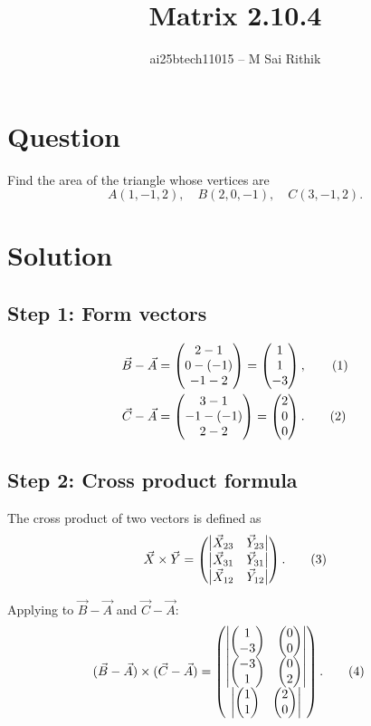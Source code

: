 \documentclass[12pt]{article}
\title{Matrix 2.10.4}
\author{ai25btech11015 -- M Sai Rithik}
\date{}
\begin{document}
\maketitle

\section*{Question}
Find the area of the triangle whose vertices are 
\[
A(1,-1,2), \quad B(2,0,-1), \quad C(3,-1,2).
\]

\section*{Solution}

\subsection*{Step 1: Form vectors}
\begin{align}
\Vec{B}-\Vec{A} &= \begin{pmatrix}2-1 \\ 0-(-1) \\ -1-2\end{pmatrix} = \begin{pmatrix}1 \\ 1 \\ -3\end{pmatrix}, \tag{1}\\
\Vec{C}-\Vec{A} &= \begin{pmatrix}3-1 \\ -1-(-1) \\ 2-2\end{pmatrix} = \begin{pmatrix}2 \\ 0 \\ 0\end{pmatrix}. \tag{2}
\end{align}

\subsection*{Step 2: Cross product formula}
The cross product of two vectors is defined as
\begin{align}
\Vec{X}\times\Vec{Y} =
\begin{pmatrix}
  \begin{vmatrix}\Vec{X}_{23} & \Vec{Y}_{23}\end{vmatrix} \\
  \begin{vmatrix}\Vec{X}_{31} & \Vec{Y}_{31}\end{vmatrix} \\
  \begin{vmatrix}\Vec{X}_{12} & \Vec{Y}_{12}\end{vmatrix}
\end{pmatrix}. \tag{3}
\end{align}

Applying to $\Vec{B}-\Vec{A}$ and $\Vec{C}-\Vec{A}$:
\begin{align}
(\Vec{B}-\Vec{A})\times(\Vec{C}-\Vec{A})
&= 
\begin{pmatrix}
\begin{vmatrix}\begin{pmatrix}1 \\ -3\end{pmatrix} & \begin{pmatrix}0 \\ 0\end{pmatrix}\end{vmatrix} \\
\begin{vmatrix}\begin{pmatrix}-3 \\ 1\end{pmatrix} & \begin{pmatrix}0 \\ 2\end{pmatrix}\end{vmatrix} \\
\begin{vmatrix}\begin{pmatrix}1 \\ 1\end{pmatrix} & \begin{pmatrix}2 \\ 0\end{pmatrix}\end{vmatrix}
\end{pmatrix}. \tag{4}
\end{align}
\end{document}
